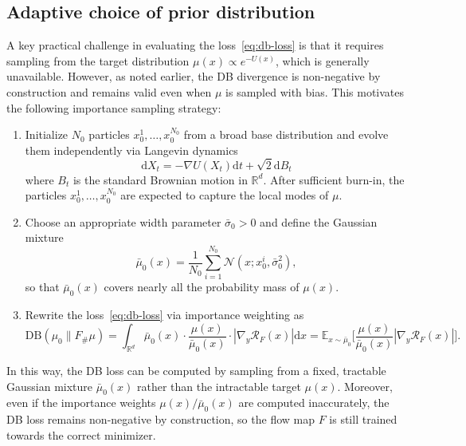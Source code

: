 \documentclass{article}
\newcommand{\D}{\mathrm{d}}
\newcommand{\DB}{\mathrm{DB}}
\theoremstyle{plain}
\begin{document}
\subsection{Adaptive choice of prior distribution}

A key practical challenge in evaluating the loss~\eqref{eq:db-loss} is that it requires sampling from the target distribution $\mu(x) \propto e^{-U(x)}$, which is generally unavailable. However, as noted earlier, the DB divergence is non-negative by construction and remains valid even when $\mu$ is sampled with bias. This motivates the following importance sampling strategy:
\begin{enumerate}
    \item Initialize $N_0$ particles $x_0^1,\dots,x_0^{N_0}$ from a broad base distribution and evolve them independently via Langevin dynamics
    \begin{equation*}
        \D X_t = -\nabla U(X_t)\D t + \sqrt{2}\D B_t
    \end{equation*}
    where $B_t$ is the standard Brownian motion in $\mathbb R^d$. After sufficient burn-in, the particles $x_0^1,\dots,x_0^{N_0}$ are expected to capture the local modes of $\mu$.
    \item Choose an appropriate width parameter $\bar\sigma_0>0$ and define the Gaussian mixture
    \begin{equation*}
        \bar \mu_0(x) = \frac{1}{N_0} \sum_{i=1}^{N_0} \mathcal N(x;x_0^i,\bar\sigma_0^2),
    \end{equation*}
    so that $\bar \mu_0(x)$ covers nearly all the probability mass of $\mu(x)$.
    \item Rewrite the loss~\eqref{eq:db-loss} via importance weighting as
    \begin{equation*}
        \DB(\mu_0 \| F_{\#}\mu) = \int_{\mathbb R^d} \bar \mu_0(x)
        \cdot \frac{\mu(x)}{\bar \mu_0(x)}\cdot
    |\nabla_y \mathcal R_F(x)|\D x =
    \mathbb E_{x\sim \bar \mu_0}\bigg[
    \frac{\mu(x)}{\bar \mu_0(x)} |\nabla_y \mathcal R_F(x)|
    \bigg].
    \end{equation*}
\end{enumerate}
In this way, the DB loss can be computed by sampling from a fixed, tractable Gaussian mixture $\bar \mu_0(x)$ rather than the intractable target $\mu(x)$. Moreover, even if the importance weights $\mu(x)/\bar \mu_0(x)$ are computed inaccurately, the DB loss remains non-negative by construction, so the flow map $F$ is still trained towards the correct minimizer.
\end{document}
